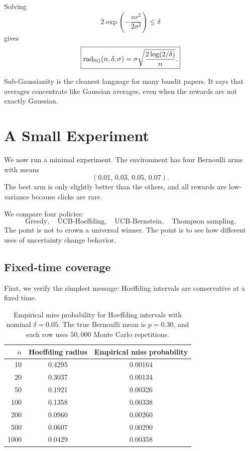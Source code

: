 \documentclass[en,nofont,11pt]{elegantbook}
\begin{document}
Solving
\[
2\exp\left(-\frac{nr^2}{2\sigma^2}\right)\le\delta
\]
gives
\[
\boxed{
\operatorname{rad}_{\rm SG}(n,\delta,\sigma)
=\sigma\sqrt{\frac{2\log(2/\delta)}{n}}.
}
\]

\begin{keyidea}
Sub-Gaussianity is the cleanest language for many bandit papers. It says that averages concentrate like Gaussian averages, even when the rewards are not exactly Gaussian.
\end{keyidea}

\chapter{A Small Experiment}

We now run a minimal experiment. The environment has four Bernoulli arms with means
\[
(0.01,\,0.03,\,0.05,\,0.07).
\]
The best arm is only slightly better than the others, and all rewards are low-variance because clicks are rare.

We compare four policies:
\[
\text{Greedy},\quad \text{UCB-Hoeffding},\quad \text{UCB-Bernstein},\quad \text{Thompson sampling}.
\]
The point is not to crown a universal winner. The point is to see how different uses of uncertainty change behavior.

\section{Fixed-time coverage}

First, we verify the simplest message: Hoeffding intervals are conservative at a fixed time.

\begin{table}[H]
\centering
\caption{Empirical miss probability for Hoeffding intervals with nominal $\delta=0.05$. The true Bernoulli mean is $p=0.30$, and each row uses $50{,}000$ Monte Carlo repetitions.}
\begin{tabular}{rcc}
\toprule
$n$ & Hoeffding radius & Empirical miss probability \\
\midrule
10 & 0.4295 & 0.00164 \\
20 & 0.3037 & 0.00134 \\
50 & 0.1921 & 0.00326 \\
100 & 0.1358 & 0.00338 \\
200 & 0.0960 & 0.00260 \\
500 & 0.0607 & 0.00290 \\
1000 & 0.0429 & 0.00358 \\
\bottomrule
\end{tabular}
\end{table}
\end{document}
